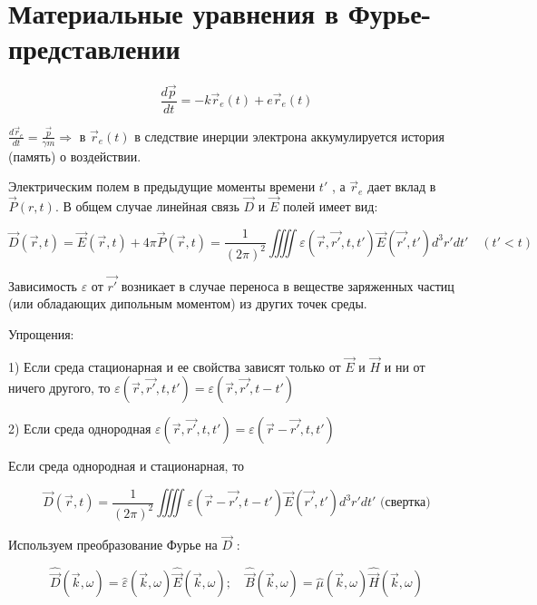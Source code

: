 \documentclass[12pt, a4paper]{report}
\begin{document}
\fi



\section{Материальные уравнения в Фурье-представлении}

\[ \frac{d \vec{p } }{dt } = - k \vec{r }_e (t )+ e \vec{r }_e (t )  \] 

\( \frac{d \vec{ r } _e }{dt }= \frac{\vec{ p } }{\gamma m }   \Rightarrow \text{ в }  \vec{r } _e (t ) \)   в следствие инерции электрона аккумулируется история (память) о воздействии.

Электрическим полем в предыдущие моменты времени \( t' \)  ,  а \( \vec{r } _e        \) дает вклад в \( \vec{P } (r,t) \). В общем случае линейная связь \( \vec{D }     \)  и \( \vec{E}  \)  полей имеет вид: 

\[ \vec{D } (\vec{r } ,t )= \vec{E } (\vec{r } , t )+ 4 \pi \vec{P } (\vec{r } , t ) = \frac{1}{(2 \pi ) ^2 } \iiiint \varepsilon(\vec{r } , \vec{r '} , t ,t ' ) \vec{E } (\vec{ r' } ,t' ) d ^3 r ' dt ' \quad ( t '< t ) \] 

Зависимость \( \varepsilon  \)  от \( \vec{r ' }  \)  возникает в случае переноса в веществе заряженных частиц (или обладающих дипольным моментом) из других точек среды.

Упрощения: 

1) Если среда стационарная и ее свойства зависят только от \( \vec{E }       \)  и \( \vec{ H}  \) и ни от ничего другого, то \( \varepsilon ( \vec{r } ,\vec{r '} , t,t ' ) =\varepsilon ( \vec{r } ,\vec{r ' } ,t -t ')  \) 

2) Если среда однородная \( \varepsilon ( \vec{r } ,\vec{r ' } ,t ,t' ) =\varepsilon ( \vec{r } - \vec{r' } , t ,t') \) 

Если среда однородная и стационарная, то 

\[ \vec{D } ( \vec{r } ,t )= \frac{1}{(2 \pi ) ^2 } \iiiint \varepsilon ( \vec{r }- \vec{r '} , t - t' ) \vec{E }  ( \vec{r' } ,t ') d ^3 r ' d t' \text{ (свертка)}    \] 

Используем преобразование Фурье на \( \vec{D}  \) :

\[ \hat{\vec{D } }(\vec{k } ,\omega )=  \hat{\varepsilon}( \vec{k } , \omega ) \hat{\vec{E }}   ( \vec{k}, \omega ); \quad \hat{\vec{B} } ( \vec{k } , \omega ) = \hat{\mu } ( \vec{k } , \omega) \hat{\vec{H }}  (\vec{k }  , \omega) \] 

\end{document}

